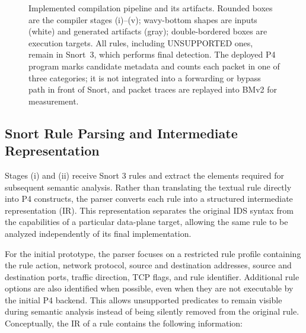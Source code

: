\documentclass{article}
\begin{document}
\begin{figure}[t]
\caption{Implemented compilation pipeline and its artifacts. Rounded boxes
are the compiler stages (i)--(v); wavy-bottom shapes are inputs (white) and
generated artifacts (gray); double-bordered boxes are execution targets. All
rules, including UNSUPPORTED ones, remain in Snort~3, which performs final
detection. The deployed P4 program marks candidate metadata and counts each
packet in one of three categories; it is not integrated into a forwarding or
bypass path in front of Snort, and packet traces are replayed into BMv2 for
measurement.}
\label{fig:pipeline-architecture}
\end{figure}

\subsection{Snort Rule Parsing and Intermediate Representation}
Stages (i) and (ii) receive Snort 3 rules and extract the elements required
for subsequent semantic analysis. Rather than translating the textual
rule directly into P4 constructs, the parser converts each rule into a
structured intermediate representation (IR). This representation
separates the original IDS syntax from the capabilities of a particular
data-plane target, allowing the same rule to be analyzed independently
of its final implementation.

For the initial prototype, the parser focuses on a restricted rule
profile containing the rule action, network protocol, source and
destination addresses, source and destination ports, traffic direction,
TCP flags, and rule identifier. Additional rule options are also
identified when possible, even when they are not executable by the
initial P4 backend. This allows unsupported predicates to remain visible
during semantic analysis instead of being silently removed from the
original rule.
Conceptually, the IR of a rule contains the following information:
\end{document}
